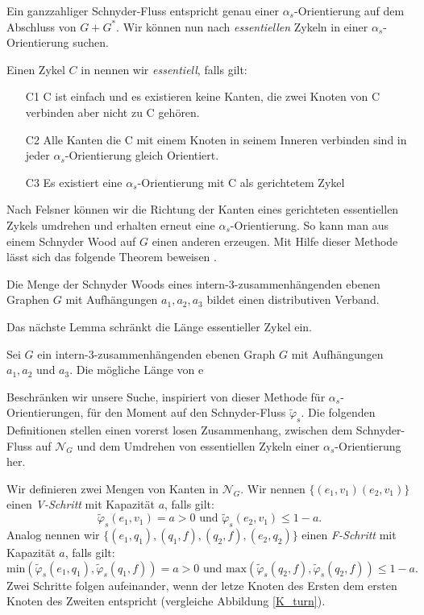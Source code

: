 Ein ganzzahliger Schnyder-Fluss entspricht genau einer $\alpha_s$-Orientierung auf dem Abschluss von $G+G^*$. Wir können nun nach \textit{essentiellen} Zykeln in einer $\alpha_s$-Orientierung suchen.

\begin{definition}
Einen Zykel $C$ in nennen wir \textit{essentiell}, falls gilt:
\begin{itemize}
\item[C1] C ist einfach und es existieren keine Kanten, die zwei Knoten von C verbinden aber nicht zu C gehören.
\item[C2] Alle Kanten die C mit einem Knoten in seinem Inneren verbinden sind in jeder $\alpha_s$-Orientierung gleich Orientiert.
\item[C3] Es existiert eine $\alpha_s$-Orientierung mit C als gerichtetem Zykel
\end{itemize}
\end{definition}

Nach Felsner können wir die Richtung der Kanten eines gerichteten essentiellen Zykels umdrehen und erhalten erneut eine $\alpha_s$-Orientierung. So kann man aus einem Schnyder Wood auf $G$ einen anderen erzeugen. Mit Hilfe dieser Methode lässt sich das folgende Theorem beweisen \cite{felsner04}.
 
\begin{theorem}
Die Menge der Schnyder Woods eines intern-3-zusammenhängenden ebenen Graphen $G$ mit Aufhängungen $a_1,a_2,a_3$ bildet einen distributiven Verband.
\end{theorem}

Das nächste Lemma schränkt die Länge essentieller Zykel ein.

\begin{lemma}
Sei $G$ ein intern-3-zusammenhängenden ebenen Graph $G$ mit Aufhängungen $a_1,a_2$ und $a_3$. Die mögliche Länge von e

\end{lemma}

Beschränken wir unsere Suche, inspiriert von dieser Methode für $\alpha_s$-Orientierungen, für den Moment auf den Schnyder-Fluss $\tilde{\varphi}_s$. Die folgenden Definitionen stellen einen vorerst losen Zusammenhang, zwischen dem Schnyder-Fluss auf $\mathcal{N}_G$ und dem Umdrehen von essentiellen Zykeln einer $\alpha_s$-Orientierung her.

\begin{definition}
Wir definieren zwei Mengen von Kanten in $\mathcal{N}_G$. Wir nennen $\{(e_1,v_1)(e_2,v_1)\}$ einen \textit{V-Schritt} mit Kapazität $a$, falls gilt: 
$$\tilde{\varphi}_s(e_1,v_1) = a > 0 \text{ und } \tilde{\varphi}_s(e_2,v_1) \leq 1 - a.$$ 
Analog nennen wir $\{(e_1,q_1),(q_1,f),(q_2,f),(e_2,q_2)\}$ einen \textit{F-Schritt} mit Kapazität $a$, falls gilt:
$$\text{min}(\tilde{\varphi}_s(e_1,q_1),\tilde{\varphi}_s(q_1,f)) = a > 0 \text{ und } \text{max}(\tilde{\varphi}_s(q_2,f),\tilde{\varphi}_s(q_2,f)) \leq 1 - a.$$
Zwei Schritte folgen aufeinander, wenn der letze Knoten des Ersten dem ersten Knoten des Zweiten entspricht (vergleiche Abbildung \ref{K_turn}).
\end{definition}

